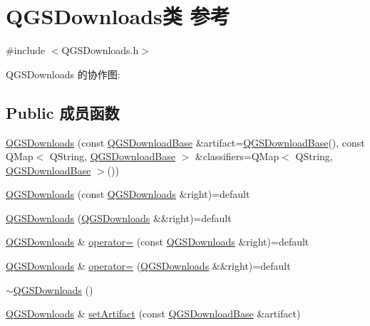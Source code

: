 \hypertarget{class_q_g_s_downloads}{}\section{Q\+G\+S\+Downloads类 参考}
\label{class_q_g_s_downloads}


{\ttfamily \#include $<$Q\+G\+S\+Downloads.\+h$>$}



Q\+G\+S\+Downloads 的协作图\+:
\subsection*{Public 成员函数}
\begin{DoxyCompactItemize}
\item 
\mbox{\hyperlink{class_q_g_s_downloads_aa04a77c3b2cd252b82f5741835355649}{Q\+G\+S\+Downloads}} (const \mbox{\hyperlink{class_q_g_s_download_base}{Q\+G\+S\+Download\+Base}} \&artifact=\mbox{\hyperlink{class_q_g_s_download_base}{Q\+G\+S\+Download\+Base}}(), const Q\+Map$<$ Q\+String, \mbox{\hyperlink{class_q_g_s_download_base}{Q\+G\+S\+Download\+Base}} $>$ \&classifiers=Q\+Map$<$ Q\+String, \mbox{\hyperlink{class_q_g_s_download_base}{Q\+G\+S\+Download\+Base}} $>$())
\item 
\mbox{\hyperlink{class_q_g_s_downloads_acb742575232e69b59c21a06b44f5576f}{Q\+G\+S\+Downloads}} (const \mbox{\hyperlink{class_q_g_s_downloads}{Q\+G\+S\+Downloads}} \&right)=default
\item 
\mbox{\hyperlink{class_q_g_s_downloads_adfe2840b933eac15f2141520bd1724cf}{Q\+G\+S\+Downloads}} (\mbox{\hyperlink{class_q_g_s_downloads}{Q\+G\+S\+Downloads}} \&\&right)=default
\item 
\mbox{\hyperlink{class_q_g_s_downloads}{Q\+G\+S\+Downloads}} \& \mbox{\hyperlink{class_q_g_s_downloads_a447e79f9e6d6571773d3e20012f3c30b}{operator=}} (const \mbox{\hyperlink{class_q_g_s_downloads}{Q\+G\+S\+Downloads}} \&right)=default
\item 
\mbox{\hyperlink{class_q_g_s_downloads}{Q\+G\+S\+Downloads}} \& \mbox{\hyperlink{class_q_g_s_downloads_ab39c1eafef1c1e53afd1d47c8f514582}{operator=}} (\mbox{\hyperlink{class_q_g_s_downloads}{Q\+G\+S\+Downloads}} \&\&right)=default
\item 
\mbox{\hyperlink{class_q_g_s_downloads_a831fbd85678dde8035789f5ca10a51dc}{$\sim$\+Q\+G\+S\+Downloads}} ()
\item 
\mbox{\hyperlink{class_q_g_s_downloads}{Q\+G\+S\+Downloads}} \& \mbox{\hyperlink{class_q_g_s_downloads_a085f058705adb95d9b124c665e56ad77}{set\+Artifact}} (const \mbox{\hyperlink{class_q_g_s_download_base}{Q\+G\+S\+Download\+Base}} \&artifact)

\end{DoxyCompactItemize}
